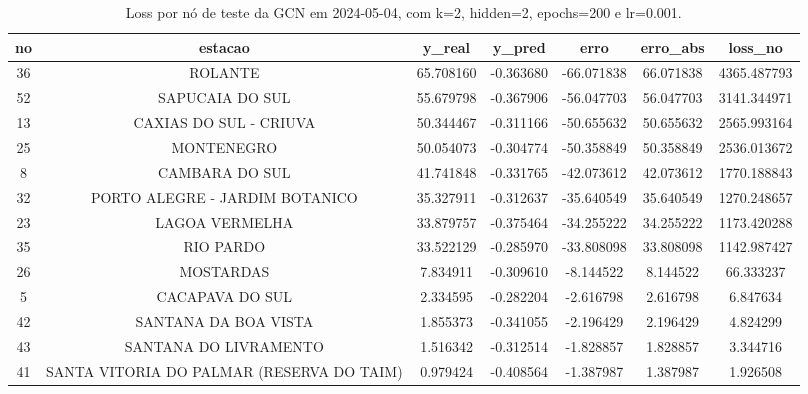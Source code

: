 \begin{table}[h]
\centering
\caption{Loss por nó de teste da GCN em 2024-05-04, com k=2, hidden=2, epochs=200 e lr=0.001.}
\label{tab:gcn_loss_nodes_k2_hidden2}
\begin{tabular}{ccccccc}
\toprule
no & estacao & y\_real & y\_pred & erro & erro\_abs & loss\_no \\
\midrule
36 & ROLANTE & 65.708160 & -0.363680 & -66.071838 & 66.071838 & 4365.487793 \\
52 & SAPUCAIA DO SUL & 55.679798 & -0.367906 & -56.047703 & 56.047703 & 3141.344971 \\
13 & CAXIAS DO SUL - CRIUVA & 50.344467 & -0.311166 & -50.655632 & 50.655632 & 2565.993164 \\
25 & MONTENEGRO & 50.054073 & -0.304774 & -50.358849 & 50.358849 & 2536.013672 \\
8 & CAMBARA DO SUL & 41.741848 & -0.331765 & -42.073612 & 42.073612 & 1770.188843 \\
32 & PORTO ALEGRE - JARDIM BOTANICO & 35.327911 & -0.312637 & -35.640549 & 35.640549 & 1270.248657 \\
23 & LAGOA VERMELHA & 33.879757 & -0.375464 & -34.255222 & 34.255222 & 1173.420288 \\
35 & RIO PARDO & 33.522129 & -0.285970 & -33.808098 & 33.808098 & 1142.987427 \\
26 & MOSTARDAS & 7.834911 & -0.309610 & -8.144522 & 8.144522 & 66.333237 \\
5 & CACAPAVA DO SUL & 2.334595 & -0.282204 & -2.616798 & 2.616798 & 6.847634 \\
42 & SANTANA DA BOA VISTA & 1.855373 & -0.341055 & -2.196429 & 2.196429 & 4.824299 \\
43 & SANTANA DO LIVRAMENTO & 1.516342 & -0.312514 & -1.828857 & 1.828857 & 3.344716 \\
41 & SANTA VITORIA DO PALMAR (RESERVA DO TAIM) & 0.979424 & -0.408564 & -1.387987 & 1.387987 & 1.926508 \\
\bottomrule
\end{tabular}
\end{table}
